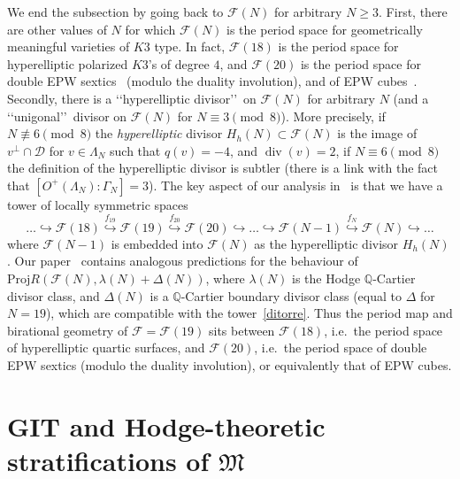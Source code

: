 \documentclass[11pt]{amsart}
\numberwithin{equation}{section}
\theoremstyle{plain}
\theoremstyle{remark}
\theoremstyle{definition}
\newcommand{\cF}{\mathscr{F}}
\newcommand{\Proj}{\mathrm{Proj}}
\newcommand{\cD}{{\mathscr D}}
\newcommand{\gM}{\mathfrak{M}}
\newcommand{\hra}{\hookrightarrow}
\newcommand{\QQ}{{\mathbb Q}}
\DeclareMathOperator{\divisore}{div}
\begin{document}
We end the subsection by going back to $\cF(N)$ for arbitrary $N\ge 3$. First, there are other values of $N$ for which $\cF(N)$ is the period space for geometrically meaningful varieties of $K3$ type. In fact, $\cF(18)$ is the period space  for hyperelliptic polarized $K3$'s of degree $4$, and $\cF(20)$ is the period space for double EPW sextics~\cite{epwperiods} (modulo the duality involution), and of EPW cubes~\cite{ikkr}. Secondly, there is a \lq\lq hyperelliptic divisor\rq\rq\ on $\cF(N)$ for arbitrary $N$ (and a \lq\lq unigonal\rq\rq\ divisor on $\cF(N)$ for $N\equiv 3\pmod{8}$). More precisely, if $N\not\equiv 6\pmod{8}$  the \emph{hyperelliptic}   divisor $H_h(N)\subset\cF(N)$ is  the image  of $v^{\bot}\cap\cD$ for $v\in\Lambda_N$ such that $q(v)=-4$, and $\divisore(v)=2$,   if   $N\equiv 6\pmod{8}$ the definition of the hyperelliptic divisor is subtler (there  is a link with the fact that  $[O^{+}(\Lambda_N):\Gamma_N]=3$). The key aspect of our analysis in~\cite{log1} is that we have a tower of locally symmetric spaces
%
\begin{equation}\label{ditorre}
%
\ldots\hra\cF(18)\overset{f_{19}}{\hra} \cF(19)\overset{f_{20}}{\hra} \cF(20)\hra\ldots \hra\cF(N-1)\overset{f_{N}}{\hra} \cF(N)\hra\ldots
%
\end{equation}
%
where $\cF(N-1)$ is embedded into $\cF(N)$ as the hyperelliptic divisor $H_h(N)$.  Our paper~\cite{log1} contains analogous predictions  for the behaviour  of 
$\Proj R(\cF(N),\lambda(N)+\Delta(N))$, where $\lambda(N)$ is the Hodge $\QQ$-Cartier divisor class, and $\Delta(N)$ is a $\QQ$-Cartier boundary divisor class (equal to $\Delta$ for $N=19$), which are compatible with the tower~\eqref{ditorre}.  Thus the period map and birational geometry of $\cF=\cF(19)$  sits between $\cF(18)$, i.e.~the period space of hyperelliptic quartic surfaces,  and $\cF(20)$, i.e.~the period space of double EPW sextics (modulo the duality involution), or equivalently that of EPW cubes.
 

\section{GIT and Hodge-theoretic stratifications of $\gM$}\label{sec:shahreview}
\setcounter{equation}{0}
%
\end{document}
